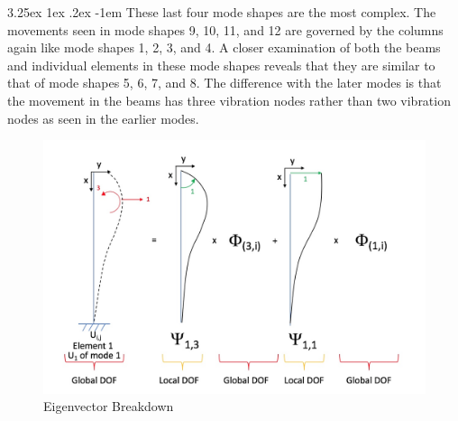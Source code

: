 \documentclass[11pt,a4paper,titlepage]{report}
\makeatletter
\renewcommand\paragraph{\@startsection{paragraph}{5}{\z@}%
  {3.25ex \@plus1ex \@minus.2ex}%
  {-1em}%
  {\normalfont\normalsize\bfseries}}
\makeatother
\begin{document}
\paragraph{} These last four mode shapes are the most complex. The movements seen in mode shapes 9, 10, 11, and 12 are governed by the columns again like mode shapes 1, 2, 3, and 4. A closer examination of both the beams and individual elements in these mode shapes reveals that they are similar to that of mode shapes 5, 6, 7, and 8. The difference with the later modes is that the movement in the beams has three vibration nodes rather than two vibration nodes as seen in the earlier modes.
\begin{figure}
    \centering
    \includegraphics[width=14cm]{Eigenvector_breakdown.jpeg}
    \caption{Eigenvector Breakdown}
    \label{fig:Eigenvector Breakdown}
\end{figure}
\newpage
\end{document}
